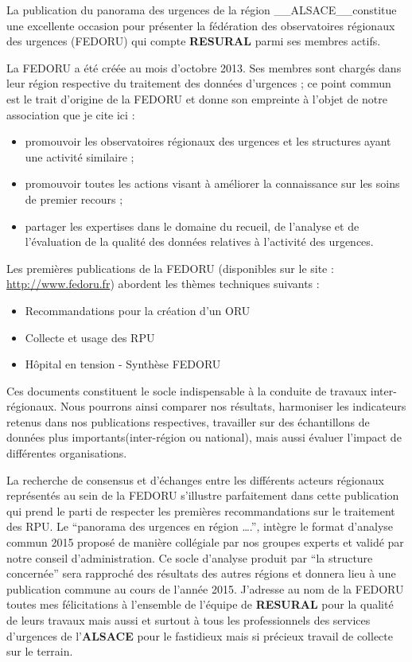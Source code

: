 \documentclass[]{article}
\begin{document}
La publication du panorama des urgences de la région
\_\_ALSACE\_\_constitue une excellente occasion pour présenter la
fédération des observatoires régionaux des urgences (FEDORU) qui compte
\textbf{RESURAL} parmi ses membres actifs.

La FEDORU a été créée au mois d'octobre 2013. Ses membres sont chargés
dans leur région respective du traitement des données d'urgences ; ce
point commun est le trait d'origine de la FEDORU et donne son empreinte
à l'objet de notre association que je cite ici :

\begin{itemize}
\itemsep1pt\parskip0pt
\item
  promouvoir les observatoires régionaux des urgences et les structures
  ayant une activité similaire ;
\item
  promouvoir toutes les actions visant à améliorer la connaissance sur
  les soins de premier recours ;
\item
  partager les expertises dans le domaine du recueil, de l'analyse et de
  l'évaluation de la qualité des données relatives à l'activité des
  urgences.
\end{itemize}

Les premières publications de la FEDORU (disponibles sur le site :
\url{http://www.fedoru.fr}) abordent les thèmes techniques suivants :

\begin{itemize}
\itemsep1pt\parskip0pt
\item
  Recommandations pour la création d'un ORU
\item
  Collecte et usage des RPU
\item
  Hôpital en tension - Synthèse FEDORU
\end{itemize}

Ces documents constituent le socle indispensable à la conduite de
travaux inter-régionaux. Nous pourrons ainsi comparer nos résultats,
harmoniser les indicateurs retenus dans nos publications respectives,
travailler sur des échantillons de données plus importants(inter-région
ou national), mais aussi évaluer l'impact de différentes organisations.

La recherche de consensus et d'échanges entre les différents acteurs
régionaux représentés au sein de la FEDORU s'illustre parfaitement dans
cette publication qui prend le parti de respecter les premières
recommandations sur le traitement des RPU. Le ``panorama des urgences en
région \ldots{}.'', intègre le format d'analyse commun 2015 proposé de
manière collégiale par nos groupes experts et validé par notre conseil
d'administration. Ce socle d'analyse produit par ``la structure
concernée'' sera rapproché des résultats des autres régions et donnera
lieu à une publication commune au cours de l'année 2015. J'adresse au
nom de la FEDORU toutes mes félicitations à l'ensemble de l'équipe de
\textbf{RESURAL} pour la qualité de leurs travaux mais aussi et surtout
à tous les professionnels des services d'urgences de l'\textbf{ALSACE}
pour le fastidieux mais si précieux travail de collecte sur le terrain.
\end{document}
